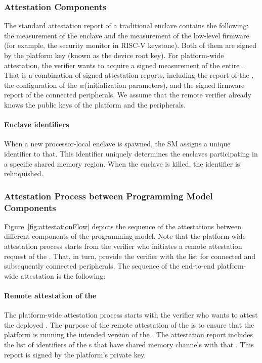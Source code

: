 \subsubsection{Attestation Components}
\label{sec:programmingModel:attestation:components}

The standard attestation report of a traditional enclave contains the following: the measurement of the enclave and the measurement of the low-level firmware (for example, the security monitor in RISC-V keystone). Both of them are signed by the platform key (known as the device root key). For platform-wide attestation, the verifier wants to acquire a signed measurement of the entire \nameenclave{}. That is a combination of signed attestation reports, including the report of the \ce, the configuration of the \ae (initialization parameters), and the signed firmware report of the connected peripherals. We assume that the remote verifier already knows the public keys of the platform and the peripherals.

\paragraph*{Enclave identifiers} When a new processor-local enclave is spawned, the SM assigns a unique identifier to that. This identifier uniquely determines the enclaves participating in a specific shared memory region. When the enclave is killed, the identifier is relinquished.


\subsubsection{Attestation Process between Programming Model Components}
\label{sec:programmingModel:attestation:process}

Figure~\ref{fig:attestationFlow} depicts the sequence of the attestations between different components of the programming model. Note that the platform-wide attestation process starts from the verifier who initiates a remote attestation request of the \app. That, in turn, provide the verifier with the list for connected \ce and subsequently connected peripherals. The sequence of the end-to-end platform-wide attestation is the following:

  
\paragraph{Remote attestation of the \app} The platform-wide attestation process starts with the verifier who wants to attest the deployed \app. The purpose of the remote attestation of the \app is to ensure that the platform is running the intended version of the \app. The \app attestation report includes the list of identifiers of the \ce{}s that have shared memory channels with that \app. This report is signed by the platform's private key. 

